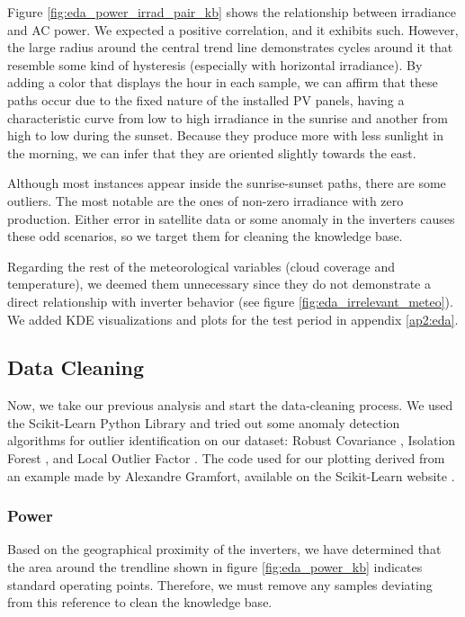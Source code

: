 Figure \ref{fig:eda_power_irrad_pair_kb} shows the relationship between irradiance and AC power. We expected a positive correlation, and it exhibits such. However, the large radius around the central trend line demonstrates cycles around it that resemble some kind of hysteresis (especially with horizontal irradiance). By adding a color that displays the hour in each sample, we can affirm that these paths occur due to the fixed nature of the installed PV panels, having a characteristic curve from low to high irradiance in the sunrise and another from high to low during the sunset. Because they produce more with less sunlight in the morning, we can infer that they are oriented slightly towards the east.

Although most instances appear inside the sunrise-sunset paths, there are some outliers. The most notable are the ones of non-zero irradiance with zero production. Either error in satellite data or some anomaly in the inverters causes these odd scenarios, so we target them for cleaning the knowledge base.

Regarding the rest of the meteorological variables (cloud coverage and temperature), we deemed them unnecessary since they do not demonstrate a direct relationship with inverter behavior (see figure \ref{fig:eda_irrelevant_meteo}). We added KDE visualizations and plots for the test period in appendix \ref{ap2:eda}.

\subsection{Data Cleaning}

Now, we take our previous analysis and start the data-cleaning process. We used the Scikit-Learn Python Library and tried out some anomaly detection algorithms for outlier identification on our dataset: Robust Covariance \cite{Rousseeuw1999}, Isolation Forest \cite{Liu2008} \cite{Liu2012}, and Local Outlier Factor \cite{Breunig2000}. The code used for our plotting derived from an example made by Alexandre Gramfort, available on the Scikit-Learn website \cite{sklearn_example}.

\subsubsection{Power}

Based on the geographical proximity of the inverters, we have determined that the area around the trendline shown in figure \ref{fig:eda_power_kb} indicates standard operating points. Therefore, we must remove any samples deviating from this reference to clean the knowledge base.

